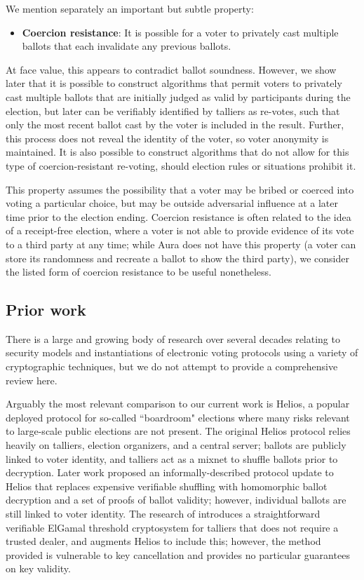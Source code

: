 \documentclass{article}
\begin{document}
We mention separately an important but subtle property:
\begin{itemize}
    \item \textbf{Coercion resistance}: It is possible for a voter to privately cast multiple ballots that each invalidate any previous ballots.
\end{itemize}

At face value, this appears to contradict ballot soundness.
However, we show later that it is possible to construct algorithms that permit voters to privately cast multiple ballots that are initially judged as valid by participants during the election, but later can be verifiably identified by talliers as re-votes, such that only the most recent ballot cast by the voter is included in the result.
Further, this process does not reveal the identity of the voter, so voter anonymity is maintained.
It is also possible to construct algorithms that do not allow for this type of coercion-resistant re-voting, should election rules or situations prohibit it.

This property assumes the possibility that a voter may be bribed or coerced into voting a particular choice, but may be outside adversarial influence at a later time prior to the election ending.
Coercion resistance is often related to the idea of a receipt-free election, where a voter is not able to provide evidence of its vote to a third party at any time; while Aura does not have this property (a voter can store its randomness and recreate a ballot to show the third party), we consider the listed form of coercion resistance to be useful nonetheless.


\subsection{Prior work}

There is a large and growing body of research over several decades relating to security models and instantiations of electronic voting protocols using a variety of cryptographic techniques, but we do not attempt to provide a comprehensive review here.

Arguably the most relevant comparison to our current work is Helios, a popular deployed protocol for so-called ``boardroom" elections where many risks relevant to large-scale public elections are not present.
The original Helios protocol \cite{helios} relies heavily on talliers, election organizers, and a central server; ballots are publicly linked to voter identity, and talliers act as a mixnet to shuffle ballots prior to decryption.
Later work proposed an informally-described protocol update to Helios \cite{helios2} that replaces expensive verifiable shuffling with homomorphic ballot decryption and a set of proofs of ballot validity; however, individual ballots are still linked to voter identity.
The research of \cite{cortier} introduces a straightforward verifiable ElGamal threshold cryptosystem for talliers that does not require a trusted dealer, and augments Helios to include this; however, the method provided is vulnerable to key cancellation and provides no particular guarantees on key validity.
\end{document}
